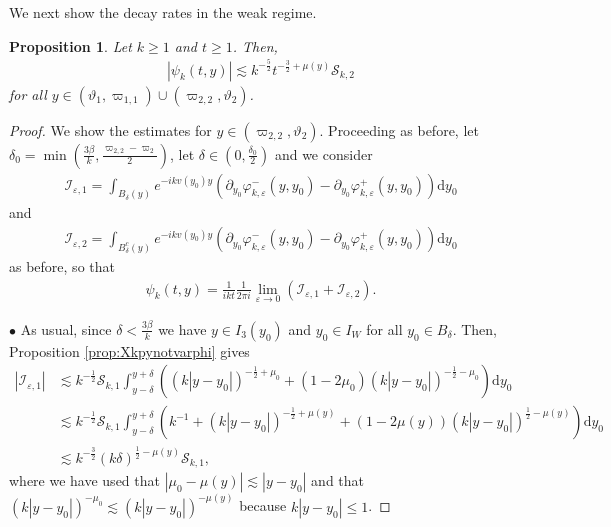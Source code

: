 \documentclass[11pt,reqno]{amsproc}
\newcommand{\bullpar}[1]{\vspace{.5em}\noindent $\bullet$ \normalfont {\bfseries #1.}}
\newtheorem{proposition}{Proposition}[section]
\theoremstyle{definition}
\numberwithin{equation}{section}
\newcommand{\cI}{{\mathcal I}}
\newcommand{\cS}{{\mathcal S}}
\renewcommand{\d}{\mathrm{d}}
\newcommand{\ep}{\varepsilon}
\begin{document}
We next show the decay rates in the weak regime.

\begin{proposition}\label{prop:IDpsiweak}
Let $k\geq 1$ and $t\geq 1$. Then, 
\begin{align*}
\left| \psi_k(t,y) \right| \lesssim k^{-\frac52}t^{-\frac32 + \mu(y)}\cS_{k,2}
\end{align*}
for all $y\in  (\vartheta_1,\varpi_{1,1})\cup (\varpi_{2,2},\vartheta_2)$.
\end{proposition}


\begin{proof}
We show the estimates for $y\in (\varpi_{2,2}, \vartheta_2)$. Proceeding as before, let $\delta_0 = \min \left( \frac{3\beta}{k}, \frac{\varpi_{2,2} - \varpi_{2}}{2}\right) $, let $\delta\in ( 0, \frac{\delta_0}{2})$ and we consider 
\begin{align*}
\cI_{\ep,1} = \int_{B_\delta(y)}e^{-ikv(y_0) y} \left( \partial_{y_0}\varphi_{k,\ep}^-(y,y_0) - \partial_{y_0} \varphi_{k,\ep}^+(y,y_0) \right) \d y_0
\end{align*}
and
\begin{align*}
\cI_{\ep,2} = \int_{B_\delta^c(y)}e^{-ikv(y_0) y} \left( \partial_{y_0}\varphi_{k,\ep}^-(y,y_0) - \partial_{y_0} \varphi_{k,\ep}^+(y,y_0) \right) \d y_0
\end{align*}
as before, so that
\begin{align*}
\psi_k(t,y) = \frac{1}{ikt}\frac{1}{2\pi i} \lim_{\ep\rightarrow 0} \left( \cI_{\ep,1} + \cI_{\ep,2} \right).
\end{align*}

\bullpar{Estimates for $\cI_{\ep,1}$} As usual, since $\delta<\frac{3\beta}{k}$ we have $y\in I_3(y_0)$ and $y_0 \in I_W$ for all $y_0\in B_\delta$. Then, Proposition \ref{prop:Xkpynotvarphi} gives
\begin{align*}
|\cI_{\ep,1}| &\lesssim k^{-\frac12}\cS_{k,1}\int_{y-\delta}^{y+\delta} \left( (k|y-y_0|)^{-\frac12+\mu_0} + (1-2\mu_0)(k|y-y_0|)^{-\frac12-\mu_0}   \right) \d y_0 \\
&\lesssim k^{-\frac12}\cS_{k,1}\int_{y-\delta}^{y+\delta} \left( k^{-1} + (k|y-y_0|)^{-\frac12+\mu(y)} +(1-2\mu(y))(k|y-y_0|)^{\frac12-\mu(y)}  \right) \d y_0 \\
&\lesssim k^{-\frac32}(k\delta)^{\frac12-\mu(y)}\cS_{k,1},
\end{align*}
where we have used that $|\mu_0-\mu(y)|\lesssim |y-y_0|$ and that $(k|y-y_0|)^{-\mu_0} \lesssim (k|y-y_0|)^{-\mu(y)}$ because $k|y-y_0| \leq 1$.


\end{proof}
\end{document}

